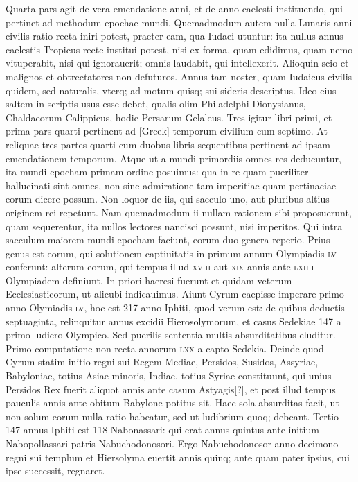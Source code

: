 Quarta pars agit de vera emendatione anni, et
de anno caelesti instituendo, qui pertinet ad methodum epochae
mundi.
Quemadmodum autem nulla Lunaris anni civilis ratio
recta iniri potest, praeter eam, qua Iudaei utuntur: ita nullus annus
caelestis Tropicus recte institui potest, nisi ex forma, quam edidimus,
quam nemo vituperabit, nisi qui ignorauerit; omnis laudabit,
qui intellexerit.
Alioquin scio et malignos et obtrectatores non defuturos. 
Annus tam noster, quam Iudaicus civilis quidem, sed naturalis,
vterq; ad motum quisq; sui sideris descriptus. 
Ideo eius saltem
in scriptis usus esse debet, qualis olim Philadelphi Dionysianus,
Chaldaeorum Calippicus, hodie Persarum Gelaleus. 
Tres igitur libri
primi, et prima pars quarti pertinent ad \textgreek{[Greek]} temporum civilium
cum septimo.
At reliquae tres partes quarti cum duobus libris
sequentibus pertinent ad ipsam emendationem temporum.
Atque
ut a mundi primordiis omnes res deducuntur, ita mundi epocham
primam ordine posuimus: qua in re quam pueriliter hallucinati sint
omnes, non sine admiratione tam imperitiae quam pertinaciae eorum
dicere possum.
Non loquor de iis, qui saeculo uno, aut pluribus altius
originem rei repetunt.
Nam quemadmodum ii nullam rationem
sibi proposuerunt, quam sequerentur, ita nullos lectores nancisci
possunt, nisi imperitos. 
Qui intra saeculum maiorem mundi
epocham faciunt, eorum duo genera reperio.
Prius genus est eorum,
qui solutionem captiuitatis in primum annum Olympiadis \textsc{lv} conferunt:
alterum eorum, qui tempus illud \textsc{xviii} aut \textsc{xix} annis ante
\textsc{lxiiii} Olympiadem definiunt.
In priori haeresi fuerunt et
quidam veterum Ecclesiasticorum, ut alicubi indicauimus. 
Aiunt
Cyrum caepisse imperare primo anno Olymiadis \textsc{lv}, hoc est 217
anno Iphiti, quod verum est: de quibus deductis septuaginta, relinquitur
annus excidii Hierosolymorum, et casus Sedekiae 147 a primo ludicro
Olympico.
Sed puerilis sententia multis absurditatibus eluditur.
Primo computatione non recta annorum \textsc{lxx} a capto Sedekia.
Deinde quod Cyrum statim initio regni sui Regem Mediae, Persidos,
Susidos, Assyriae, Babyloniae, totius Asiae minoris, Indiae, totius
Syriae constituunt, qui unius Persidos Rex fuerit aliquot annis ante
casum Astyagis[?], et post illud tempus pauculis annis ante obitum
Babylone potitus sit.
Haec sola absurditas facit, ut non solum eorum
nulla ratio habeatur, sed ut ludibrium quoq; debeant.
Tertio 147 annus
Iphiti est 118 Nabonassari: qui erat annus quintus ante initium Nabopollassari
patris Nabuchodonosori.
Ergo Nabuchodonosor anno
decimono regni sui templum et Hiersolyma euertit annis quinq;
ante quam pater ipsius, cui ipse successit, regnaret.

